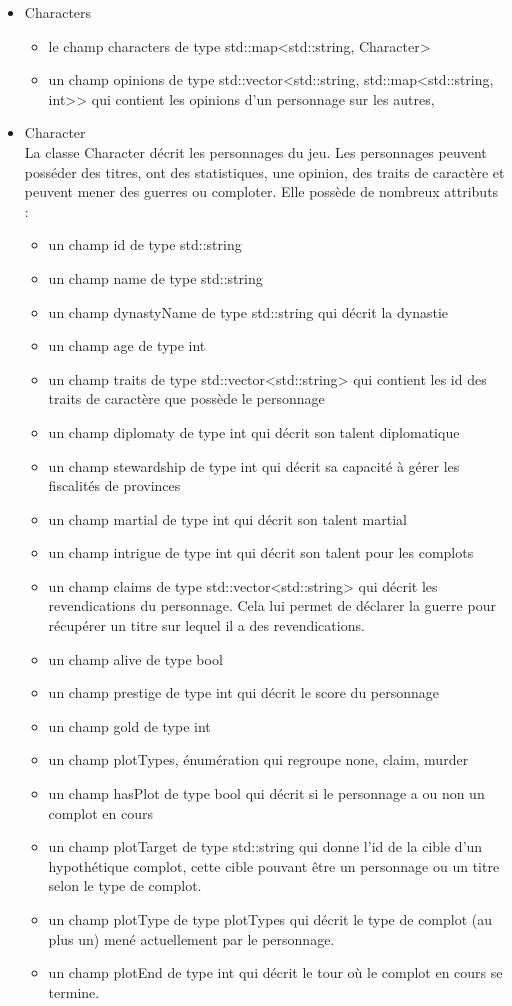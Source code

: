 \documentclass[a4paper,12pt]{article}
\begin{document}
\begin{itemize}
\item Characters\\
\begin{itemize}
\item le champ characters de type std::map<std::string, Character>
\item un champ opinions de type std::vector<std::string, std::map<std::string, int>> qui contient les opinions d'un personnage sur les autres,
\end{itemize}
\item Character\\
La classe Character décrit les personnages du jeu. Les personnages peuvent posséder des titres, ont des statistiques, une opinion, des traits de caractère et peuvent mener des guerres ou comploter. Elle possède de nombreux attributs :
\begin{itemize}
\item un champ id de type std::string
\item un champ name de type std::string
\item un champ dynastyName de type std::string qui décrit la dynastie
\item un champ age de type int
\item un champ traits de type std::vector<std::string> qui contient les id des traits de caractère que possède le personnage
\item un champ diplomaty de type int qui décrit son talent diplomatique
\item un champ stewardship de type int qui décrit sa capacité à gérer les fiscalités de provinces
\item un champ martial de type int qui décrit son talent martial
\item un champ intrigue de type int qui décrit son talent pour les complots
\item un champ claims de type std::vector<std::string> qui décrit les revendications du personnage. Cela lui permet de déclarer la guerre pour récupérer un titre sur lequel il a des revendications.
\item un champ alive de type bool
\item un champ prestige de type int qui décrit le score du personnage
\item un champ gold de type int
\item un champ plotTypes, énumération qui regroupe {none, claim, murder}
\item un champ hasPlot de type bool qui décrit si le personnage a ou non un complot en cours
\item un champ plotTarget de type std::string qui donne l'id de la cible d'un hypothétique complot, cette cible pouvant être un personnage ou un titre selon le type de complot.
\item un champ plotType de type plotTypes qui décrit le type de complot (au plus un) mené actuellement par le personnage.
\item un champ plotEnd de type int qui décrit le tour où le complot en cours se termine.\\
\end{itemize}


\end{itemize}
\end{document}
